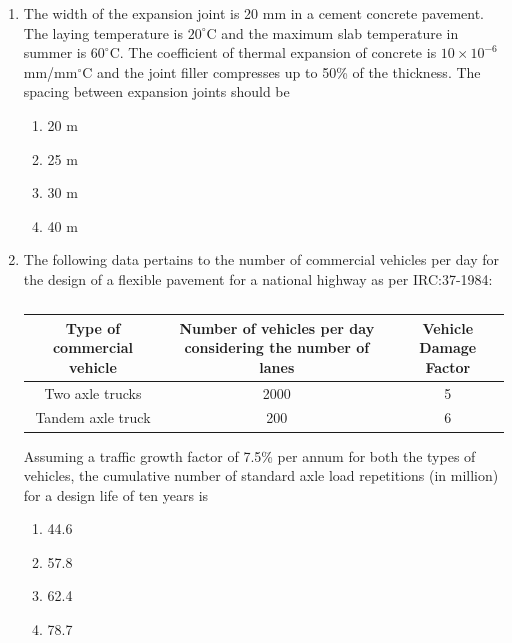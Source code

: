 \documentclass[journal,12pt,onecolumn]{IEEEtran}
\theoremstyle{remark}
\begin{document}
\begin{enumerate}
\item The width of the expansion joint is 20 mm in a cement concrete pavement. The laying temperature is $20^\circ$C and the maximum slab temperature in summer is $60^\circ$C. The coefficient of thermal expansion of concrete is $10 \times 10^{-6}$ mm/mm$^\circ$C and the joint filler compresses up to 50\% of the thickness. The spacing between expansion joints should be

\hfill{}
\begin{enumerate}
\item 20 m
\item 25 m
\item 30 m
\item 40 m
\end{enumerate}

\item The following data pertains to the number of commercial vehicles per day for the design of a flexible pavement for a national highway as per IRC:37-1984:

\begin{table}[H]
\centering
\begin{tabular}{|c|c|c|}
\hline
Type of commercial vehicle & Number of vehicles per day considering the number of lanes & Vehicle Damage Factor \\
\hline
Two axle trucks & 2000 & 5\\
\hline
Tandem axle truck & 200 & 6\\
\hline
\end{tabular}
\caption*{}
\label{tab:Q.63}
\end{table}

Assuming a traffic growth factor of 7.5\% per annum for both the types of vehicles, the cumulative number of standard axle load repetitions (in million) for a design life of ten years is

\hfill{}
\begin{enumerate}
\item 44.6
\item 57.8
\item 62.4
\item 78.7
\end{enumerate}


\end{enumerate}
\end{document}
